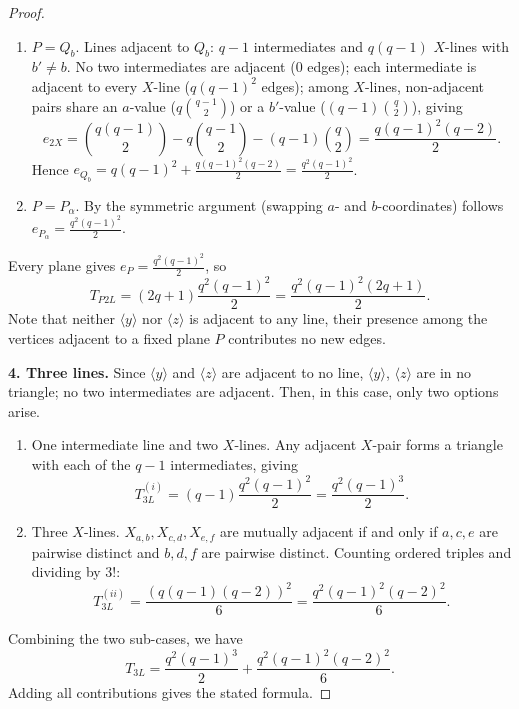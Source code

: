\documentclass[11pt]{amsart}
\theoremstyle{plain}
\begin{document}
\begin{proof}
\begin{enumerate}
\smallskip

\item[(ii)] $P= Q_b$. Lines adjacent to $Q_{b}$: $q-1$ intermediates and $q(q-1)$ $X$-lines with $b'\neq b$.  No two intermediates are adjacent ($0$ edges); each intermediate is adjacent to every $X$-line ($q(q-1)^2$ edges); among $X$-lines, non-adjacent pairs share an $a$-value ($q\binom{q-1}{2}$) or a $b'$-value ($(q-1)\binom{q}{2}$), giving
\begin{equation}\label{e2X-B2}
e_{2X} =\binom{q(q-1)}{2}-q\binom{q-1}{2}-(q-1)\binom{q}{2} =\frac{q(q-1)^2(q-2)}{2}.
\end{equation}
Hence $e_{Q_{b}}=q(q-1)^2+\frac{q(q-1)^2(q-2)}{2}=\frac{q^2(q-1)^2}{2}$.

\smallskip

\item[(iii)] $P= P_{\alpha}$. By the symmetric argument (swapping $a$- and $b$-coordinates) follows $e_{P_{\alpha}} =\frac{q^2(q-1)^2}{2}$.
\end{enumerate}
Every plane gives $e_{P}=\frac{q^2(q-1)^2}{2}$, so
\[T_{P2L}=(2q+1) \frac{q^2(q-1)^2}{2} =\frac{q^2(q-1)^2(2q+1)}{2}.\]
Note that neither $\langle y\rangle$ nor $\langle z \rangle$ is adjacent to any line, their presence
among the vertices adjacent to a fixed plane $P$ contributes no new edges. 

\smallskip
\noindent\textbf{4. Three lines.} Since $\langle y \rangle$ and $\langle z
\rangle$ are adjacent to no line, $\langle y\rangle$, $\langle z\rangle$ are in no triangle; no two intermediates are adjacent. Then, in this case, only two options arise.
\begin{enumerate}
\item[(i)] One intermediate line and two $X$-lines. Any adjacent $X$-pair forms a triangle with each of the $q-1$ intermediates, giving
\[T_{3L}^{(i)} = (q-1) \frac{q^2(q-1)^2}{2}=\frac{q^2(q-1)^3}{2}.\]

\item[(ii)] Three $X$-lines. $X_{a,b},X_{c,d},X_{e,f}$ are mutually adjacent if and only if $a,c,e$ are pairwise distinct and $b,d,f$ are pairwise distinct.  Counting ordered triples and dividing by $3!$: 
\[T_{3L}^{(ii)} =\frac{(q(q-1)(q-2))^2}{6}=\frac{q^2(q-1)^2(q-2)^2}{6}.\]
\end{enumerate}
Combining the two sub-cases, we have
\[T_{3L}=\frac{q^2(q-1)^3}{2}+\frac{q^2(q-1)^2(q-2)^2}{6}.\]
Adding all contributions gives the stated formula.
\end{proof}
\end{document}

